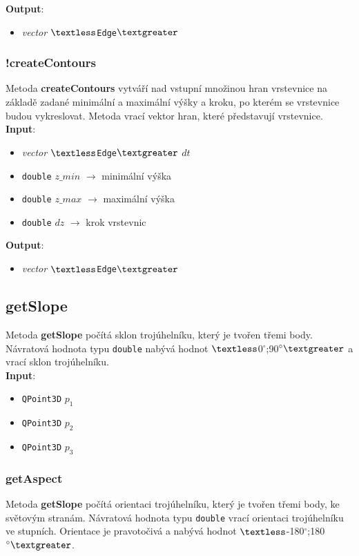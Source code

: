 \documentclass[a4paper, 12pt]{article}
\begin{document}
\textbf{Output}:
\begin{itemize}
\item \textsl{vector} $\textless$\texttt{Edge}$\textgreater$
\end{itemize}

\subsubsection*{!createContours}
Metoda \textbf{createContours} vytváří nad vstupní množinou hran vrstevnice na základě zadané minimální a maximální výšky a kroku, po kterém se vrstevnice budou vykreslovat.  Metoda vrací vektor hran, které představují vrstevnice.\\

\textbf{Input}:
\begin{itemize}
\item \textsl{vector} $\textless$\texttt{Edge}$\textgreater$ $dt$
\item \texttt{double} $z\_min$ $\rightarrow$ minimální výška
\item \texttt{double} $z\_max$ $\rightarrow$ maximální výška
\item \texttt{double} $dz$ $\rightarrow$ krok vrstevnic
\end{itemize}

\textbf{Output}:
\begin{itemize}
\item \textsl{vector} $\textless$\texttt{Edge}$\textgreater$
\end{itemize}

\subsection*{getSlope}
Metoda \textbf{getSlope} počítá sklon trojúhelníku, který je tvořen třemi body. Návratová hodnota typu \texttt{double} nabývá hodnot $\textless$0$^\circ$;90$^\circ\textgreater$ a vrací sklon trojúhelníku.\\

\textbf{Input}:
\begin{itemize}
\item \texttt{QPoint3D} $p_1$
\item \texttt{QPoint3D} $p_2$
\item \texttt{QPoint3D} $p_3$
\end{itemize}

\subsubsection*{getAspect}
Metoda \textbf{getSlope} počítá orientaci trojúhelníku, který je tvořen třemi body, ke světovým stranám. Návratová hodnota typu \texttt{double} vrací orientaci trojúhelníku ve stupních. Orientace je pravotočivá a nabývá hodnot $\textless$-180$^\circ$;180$^\circ\textgreater$.\\
\end{document}
